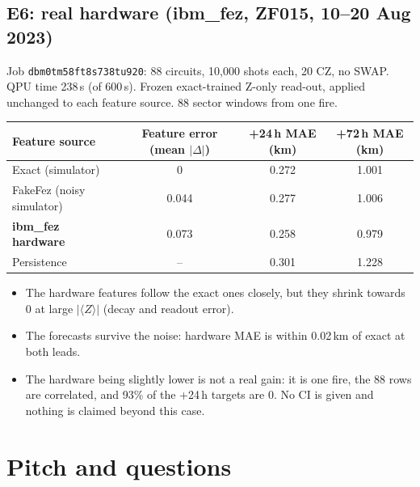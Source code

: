 \documentclass[11pt,a4paper]{article}
\newcommand{\code}[1]{\texttt{\small #1}}
\begin{document}
\subsection{E6: real hardware (ibm\_fez, ZF015, 10--20 Aug 2023)}
Job \code{dbm0tm58ft8s738tu920}: 88 circuits, 10{,}000 shots each, 20 CZ, no SWAP. QPU time 238\,s (of 600\,s).
Frozen exact-trained Z-only read-out, applied unchanged to each feature source. 88 sector windows from one fire.
\begin{center}\small
\begin{tabular}{@{}l c c c@{}}
\toprule
\textbf{Feature source} & \textbf{Feature error} (mean $|\Delta|$) & \textbf{+24\,h MAE (km)} & \textbf{+72\,h MAE (km)}\\
\midrule
Exact (simulator) & 0 & 0.272 & 1.001\\
FakeFez (noisy simulator) & 0.044 & 0.277 & 1.006\\
\textbf{ibm\_fez hardware} & 0.073 & 0.258 & 0.979\\
Persistence & -- & 0.301 & 1.228\\
\bottomrule
\end{tabular}
\end{center}
\begin{itemize}
\item The hardware features follow the exact ones closely, but they shrink towards 0 at large $|\langle Z\rangle|$
  (decay and readout error).
\item The forecasts survive the noise: hardware MAE is within 0.02\,km of exact at both leads.
\item The hardware being slightly lower is not a real gain: it is one fire, the 88 rows are correlated, and 93\% of
  the +24\,h targets are 0. No CI is given and nothing is claimed beyond this case.
\end{itemize}

\section{Pitch and questions}
\end{document}
